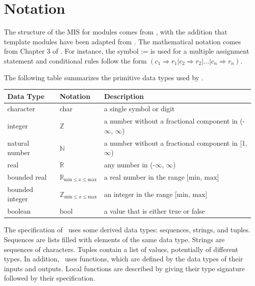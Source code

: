 \documentclass[12pt, titlepage]{article}
\begin{document}
\section{Notation}


The structure of the MIS for modules comes from \citet{HoffmanAndStrooper1995},
with the addition that template modules have been adapted from
\cite{GhezziEtAl2003}.  The mathematical notation comes from Chapter 3 of
\citet{HoffmanAndStrooper1995}.  For instance, the symbol := is used for a
multiple assignment statement and conditional rules follow the form $(c_1
\Rightarrow r_1 | c_2 \Rightarrow r_2 | ... | c_n \Rightarrow r_n )$.

The following table summarizes the primitive data types used by \progname. 

\begin{center}
\renewcommand{\arraystretch}{1.2}
\noindent 
\begin{tabular}{l l p{7.5cm}} 
\toprule 
\textbf{Data Type} & \textbf{Notation} & \textbf{Description}\\ 
\midrule
character & char & a single symbol or digit\\
integer & $\mathbb{Z}$ & a number without a fractional component in (-$\infty$, $\infty$) \\
natural number & $\mathbb{N}$ & a number without a fractional component in [1, $\infty$) \\
real & $\mathbb{R}$ & any number in (-$\infty$, $\infty$)\\
bounded real & $\mathbb{R}_{\text{min} \leq x \leq \text{max}}$ & a real number in the range [$\text{min}$, $\text{max}$]\\
bounded integer & $\mathbb{Z}_{\text{min} \leq x \leq \text{max}}$ & an integer in the range [$\text{min}$, $\text{max}$]\\
boolean & bool & a value that is either true or false\\
\bottomrule
\end{tabular} 
\end{center}

\noindent
The specification of \progname \ uses some derived data types: sequences, strings, and
tuples. Sequences are lists filled with elements of the same data type. Strings
are sequences of characters. Tuples contain a list of values, potentially of
different types. In addition, \progname \ uses functions, which
are defined by the data types of their inputs and outputs. Local functions are
described by giving their type signature followed by their specification.
\end{document}
